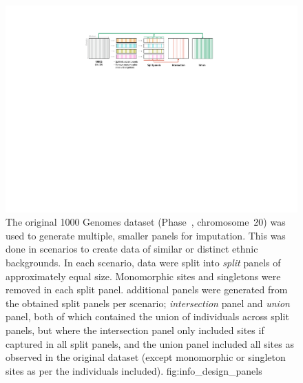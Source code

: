 

\begin{figure}[!htb]
\includegraphics[width=\textwidth]{./img/ch2/info_design_panels}
{The original 1000 Genomes dataset (Phase~, chromosome~20) was used to generate multiple, smaller panels for imputation.
This was done in  scenarios to create data of similar or distinct ethnic backgrounds.
In each scenario, data were split into  \emph{split} panels of approximately equal size.
Monomorphic sites and singletons were removed in each split panel.
 additional panels were generated from the obtained split panels per scenario;
 \emph{intersection} panel and  \emph{union} panel, both of which contained the union of individuals across split panels, but where the intersection panel only included sites if captured in all split panels, and the union panel included all sites as observed in the original dataset (except monomorphic or singleton sites as per the individuals included).}
{fig:info_design_panels}
\end{figure}
